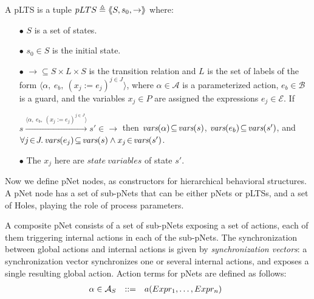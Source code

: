 \documentclass{lncs/llncs}
\def\AlgE{\mathcal{E}}
\def\AlgA{\mathcal{A}}
\def\AlgAS{\mathcal{A}_S}
\def\AlgB{\mathcal{B}}
\begin{document}
\begin{definition}[pLTS]
\label{pLTS}
A pLTS is a tuple
$pLTS\triangleq\langle\hspace{-0.58ex}\langle S,s_0, \to\rangle\hspace{-0.58ex}\rangle$ where:
\begin{itemize}
\item[$\bullet$]
$S$ is a set of states.
\item[$\bullet$]
$s_0 \in S$ is the initial state.
\item[$\bullet$] $\to \subseteq S \times L \times S$ is the transition relation and 
$L$ is the set of labels of the form
$\langle \alpha,~e_b,~(x_j\!:= {e}_j)^{j\in J}\rangle$,
where $\alpha \in\AlgA$ is a parameterized action, $e_b \in
\AlgB$ is a guard, and the variables $x_j\in P$
are assigned the expressions $e_j\in \AlgE$.
If 

$s \xrightarrow{\langle \alpha,~e_b,~(x_j\!:= {e}_j)^{j\in
		J}\rangle} s'\in \to $ then 
		$\vars(\alpha)\!\subseteq\! \vars(s)$, 
		$\vars(e_b)\!\subseteq\! \vars(s')$, and
		$\forall j\!\in\! J .\,\vars(e_j)\!\subseteq\! \vars(s)\land 
x_j\!\in\!\vars(s')$.

\item[$\bullet$]
The $x_j$ here are $state\ variables$ of state $s'$. 


\end{itemize}
\end{definition}

Now we define
pNet nodes, as constructors for hierarchical behavioral structures.
A pNet node has a set of sub-pNets that can be either pNets or pLTSs, and a
set of Holes, playing the role of process parameters.

A composite pNet consists of a set of sub-pNets exposing
a set of actions, each of them triggering internal actions in each of
the sub-pNets. The synchronization between global actions and
internal actions is given by  \emph{synchronization vectors}: a
synchronization vector synchronizes one or several internal actions, and
exposes a single resulting global action.
Action terms for pNets are defined as follows:
\[\begin{array}[l]{rcl@{\quad}l}
  \alpha\in \AlgAS &::=&a(Expr_1,\ldots,Expr_n)
\end{array}
\]
\end{document}
